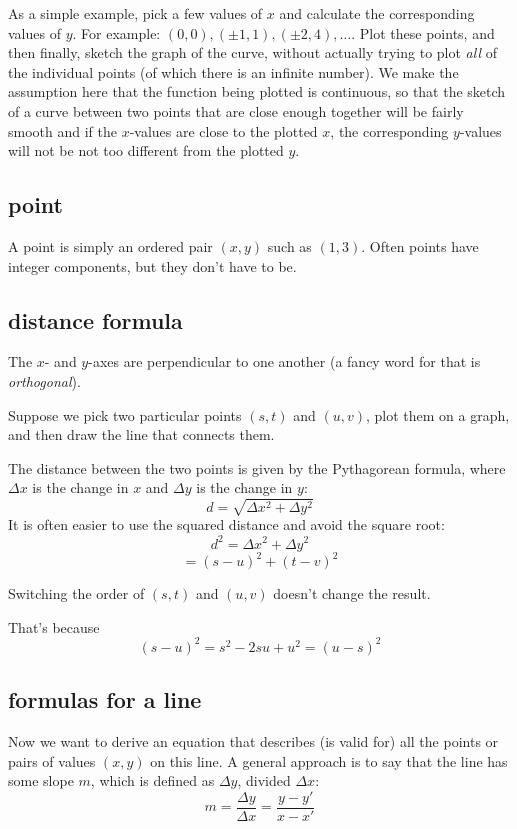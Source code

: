 \documentclass[11pt, oneside]{article}
\begin{document}
As a simple example, pick a few values of $x$ and calculate the corresponding values of $y$.  For example:  $(0,0), (\pm 1,1), (\pm 2, 4), \dots$.  Plot these points, and then finally, sketch the graph of the curve, without actually trying to plot \emph{all} of the individual points (of which there is an infinite number).  We make the assumption here that the function being plotted is continuous, so that the sketch of a curve between two points that are close enough together will be fairly smooth and if the $x$-values are close to the plotted $x$, the corresponding $y$-values will not be not too different from the plotted $y$.

\subsection*{point}
A point is simply an ordered pair $(x,y)$ such as $(1,3)$.  Often points have integer components, but they don't have to be.

\subsection*{distance formula}
The $x$- and $y$-axes are perpendicular to one another (a fancy word for that is \emph{orthogonal}).  

Suppose we pick two particular points $(s,t)$ and $(u,v)$, plot them on a graph, and then draw the line that connects them.

The distance between the two points is given by the Pythagorean formula, where $\Delta x$ is the change in $x$ and $\Delta y$ is the change in $y$:
\[ d = \sqrt{\Delta x^2 + \Delta y^2} \]
It is often easier to use the squared distance and avoid the square root:
\[ d^2 = \Delta x^2 + \Delta y^2 \]
\[ = (s-u)^2 + (t-v)^2 \]

Switching the order of $(s,t)$ and $(u,v)$ doesn't change the result.

That's because
\[ (s - u)^2 = s^2 - 2su + u^2 = (u - s)^2 \]

\subsection*{formulas for a line}
 
Now we want to derive an equation that describes (is valid for) all the points or pairs of values $(x,y)$ on this line.  A general approach is to say that the line has some slope $m$, which is defined as $\Delta y$, divided $\Delta x$:
\[ m = \frac{\Delta y}{\Delta x} = \frac{y-y'}{x-x'} \]
\end{document}
